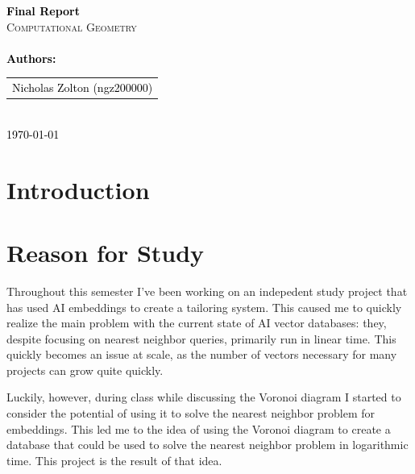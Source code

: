 \documentclass{article}
\begin{document}
\begin{titlepage}
    \selectfont 
    \vspace*{3cm}
    
    \centering
    {\Huge \textbf{\textcolor{black}{Final Report}}}\\[1.5cm]
    \textsc{\LARGE Computational Geometry}\\[0.5cm]
    \\[2cm]
    
    {\Large \textbf{\textcolor{black}{Authors:}}}\\[0.5cm]
    \begin{tabular}{c}
        \Large \textcolor{black}{Nicholas Zolton (ngz200000)} \\
    \end{tabular}\\[2cm]
    
    {\Large \textcolor{black}{\today}}
    
    \vfill
\end{titlepage}

\tableofcontents
\newpage

\section*{Introduction}

\section{Reason for Study}
Throughout this semester I've been working on an indepedent study 
project that has used AI embeddings to create a tailoring system. 
This caused me to quickly realize the main problem with the current
state of AI vector databases: they, despite focusing on nearest neighbor
queries, primarily run in linear time. This quickly becomes an issue
at scale, as the number of vectors necessary for many projects can 
grow quite quickly.
\newline

\noindent
Luckily, however, during class while discussing the Voronoi diagram
I started to consider the potential of using it to solve the nearest
neighbor problem for embeddings. This led me to the idea of using the Voronoi diagram
to create a database that could be used to solve the nearest neighbor
problem in logarithmic time. This project is the result of that idea.
\end{document}
